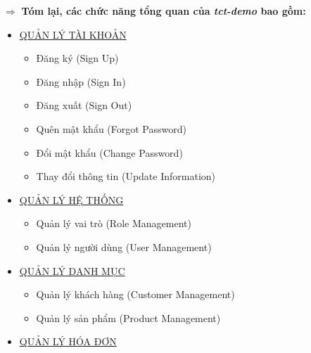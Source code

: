 



$\Rightarrow$ \textbf{Tóm lại, các chức năng tổng quan của \emph{tct-demo} bao gồm:}

\begin{itemize}
    \item                        \underline{\textsc{QUẢN LÝ TÀI KHOẢN}}
          \begin{itemize}
              \item                        Đăng ký (Sign Up)
              \item                        Đăng nhập (Sign In)
              \item                        Đăng xuất (Sign Out)
              \item                            Quên mật khẩu (Forgot Password)
              \item                            Đổi mật khẩu (Change Password)
              \item                            Thay đổi thông tin (Update Information)
          \end{itemize}
    \item                  \underline{\textsc{QUẢN LÝ HỆ THỐNG}}
          \begin{itemize}
              \item                 Quản lý vai trò (Role     Management)
              \item               Quản lý người dùng (User Management)
          \end{itemize}
    \item                   \underline{\textsc{QUẢN LÝ DANH MỤC}}
          \begin{itemize}
              \item              Quản lý  khách hàng (Customer     Management)
              \item           Quản lý  sản phẩm       (Product     Management)
          \end{itemize}  
          \item        \underline{\textsc{QUẢN LÝ HÓA ĐƠN}}
          \begin{itemize}

\end{itemize}
\end{itemize}
